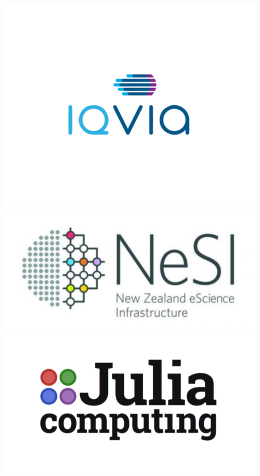 \documentclass[t]{beamer}
\begin{document}
\begin{frame}
\begin{center}
    \includegraphics[scale=0.12]{IQVIA_logo.png}
    \includegraphics[scale=0.12]{NESI-logo.jpg}
    \includegraphics[scale=0.12]{julia.png}
  \end{center}
\end{frame}
\end{document}
